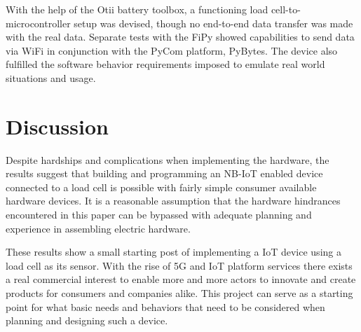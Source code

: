 \iffalse
\begin{itemize}
	\item Don’t make the reader do all the work
	\item Have a hypothesis, test them, state result clearly
	\item Two lists are not a comparison
	\item Be the first to criticize your own work
\end{itemize}
\fi

With the help of the Otii battery toolbox, a functioning load cell-to-microcontroller setup was devised, though no end-to-end data transfer was made with the real data. Separate tests with the FiPy showed capabilities to send data via WiFi in conjunction with the PyCom platform, PyBytes. %
The device also fulfilled the software behavior requirements imposed to emulate real world situations and usage.

\section{Discussion}
Despite hardships and complications when implementing the hardware, the results suggest that building and programming an NB-IoT enabled device connected to a load cell is possible with fairly simple consumer available hardware devices. It is a reasonable assumption that the hardware hindrances encountered in this paper can be bypassed with adequate planning and experience in assembling electric hardware.

These results show a small starting post of implementing a IoT device using a load cell as its sensor. With the rise of 5G and IoT platform services there exists a real commercial interest to enable more and more actors to innovate and create products for consumers and companies alike. This project can serve as a starting point for what basic needs and behaviors that need to be considered when planning and designing such a device.	

